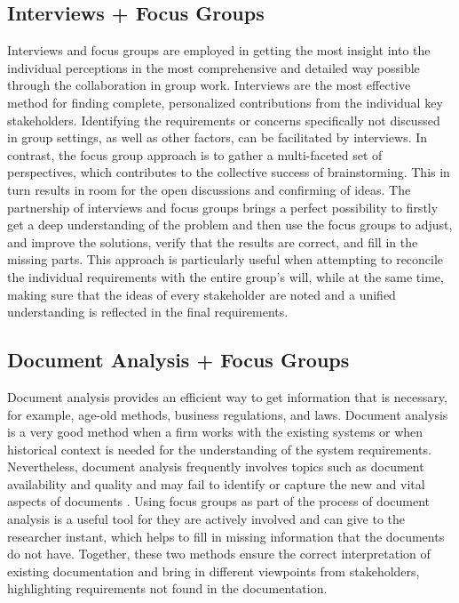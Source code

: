 \documentclass[conference]{IEEEtran}
\begin{document}
\subsection{Interviews + Focus Groups}
Interviews and focus groups are employed in getting the most insight into the individual perceptions in the most comprehensive and detailed way possible through the collaboration in group work. Interviews are the most effective method for finding complete, personalized contributions from the individual key stakeholders. Identifying the requirements or concerns specifically not discussed in group settings, as well as other factors, can be facilitated by interviews. In contrast, the focus group approach is to gather a multi-faceted set of perspectives, which contributes to the collective success of brainstorming. This in turn results in room for the open discussions and confirming of ideas. The partnership of interviews and focus groups brings a perfect possibility to firstly get a deep understanding of the problem and then use the focus groups to adjust, and improve the solutions, verify that the results are correct, and fill in the missing parts. This approach is particularly useful when attempting to reconcile the individual requirements with the entire group's will, while at the same time, making sure that the ideas of every stakeholder are noted and a unified understanding is reflected in the final requirements.

\subsection{Document Analysis + Focus Groups}
Document analysis provides an efficient way to get information that is necessary, for example, age-old methods, business regulations, and laws. Document analysis is a very good method when a firm works with the existing systems or when historical context is needed for the understanding of the system requirements. Nevertheless, document analysis frequently involves topics such as document availability and quality and may fail to identify or capture the new and vital aspects of documents \cite{cite16}.  Using focus groups as part of the process of document analysis is a useful tool for they are actively involved and can give to the researcher instant, which helps to fill in missing information that the documents do not have. Together, these two methods ensure the correct interpretation of existing documentation and bring in different viewpoints from stakeholders, highlighting requirements not found in the documentation.
\end{document}
